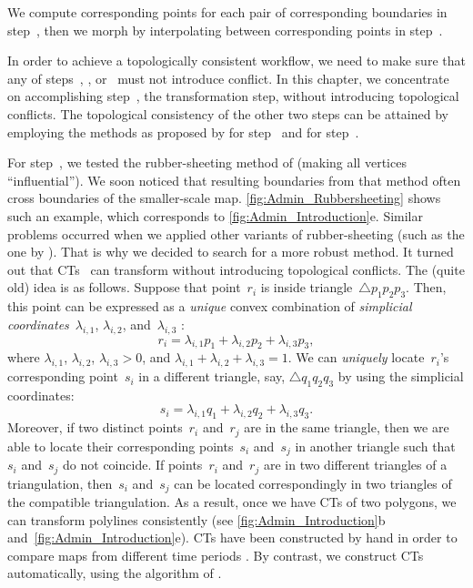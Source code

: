 We compute corresponding points 
for each pair of corresponding boundaries in step~,
then we morph by interpolating between corresponding points 
in step~.

In order to achieve a topologically consistent workflow, 
we need to make sure that any of
steps~, , or~
must not introduce conflict.
In this chapter, we concentrate on accomplishing 
step~, the transformation step, 
without introducing topological conflicts.  
The topological consistency of the other two steps 
can be attained by employing the methods as proposed by
\textcite{Saalfeld1999} for step~ and 
\textcite{GotsmanS2001} for step~.

For step~,
we tested the rubber-sheeting method of \textcite{Doytsher2001} 
(making all vertices ``influential'').  
We soon noticed that resulting boundaries from that method 
often cross boundaries of the smaller-scale map. 
\fig\ref{fig:Admin_Rubbersheeting} shows such an example, 
which corresponds to \fig\ref{fig:Admin_Introduction}e. 
Similar problems occurred 
when we applied other variants of rubber-sheeting
(such as the one by \textcite{Haunert2005Conflation}).
That is why we decided to search for a more robust method.  
It turned out that 
CTs~\parencite{AronovSS93} can 
transform without introducing topological conflicts.  
The (quite old) idea is as follows.  
Suppose that point~$r_i$ is inside triangle~$\triangle{p_1p_2p_3}$. 
Then, this point can be expressed as a
\emph{unique} convex combination of 
\emph{simplicial coordinates}~$\lambda_{i,1}$, 
$\lambda_{i,2}$, and~$\lambda_{i,3}$ 
\parencite{Saalfeld1985-RS}:
\[
r_i=\lambda_{i,1}p_1+\lambda_{i,2}p_2+\lambda_{i,3}p_3,
\]
where $\lambda_{i,1}$, $\lambda_{i,2}$, $\lambda_{i,3}>0$, and
$\lambda_{i,1}+\lambda_{i,2}+\lambda_{i,3}=1$. 
We can \emph{uniquely} locate~$r_i$'s corresponding point~$s_i$ 
in a different triangle, say, $\triangle{q_1q_2q_3}$ 
by using the simplicial coordinates:
\[
s_i=\lambda_{i,1}q_1+\lambda_{i,2}q_2+\lambda_{i,3}q_3.
\]
Moreover, if two distinct points~$r_i$ and~$r_j$ are in the
same triangle, 
then we are able to locate their 
corresponding points~$s_i$ and~$s_j$ in another triangle 
such that~$s_i$ and~$s_j$ do not coincide.
If points~$r_i$ and~$r_j$ are in two different
triangles of a triangulation, 
then~$s_i$ and~$s_j$ can be located correspondingly 
in two triangles of the compatible triangulation. 
As a result, once we have CTs of two 
polygons, we can transform polylines consistently
(see \figs\ref{fig:Admin_Introduction}b 
and~\ref{fig:Admin_Introduction}e). 
CTs have been constructed by hand in order to compare
maps from different time periods \textcite{Fuse2004}. 
By contrast, we construct CTs
automatically, using the algorithm of \textcite{AronovSS93}.

